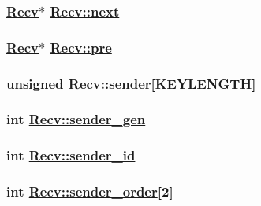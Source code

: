 \hypertarget{classRecv_o11}{
\subsubsection[next]{\setlength{\rightskip}{0pt plus 5cm}\hyperlink{classRecv}{Recv}$\ast$ \hyperlink{classRecv_o11}{Recv::next}}}
\label{classRecv_o11}


\hypertarget{classRecv_o10}{
\subsubsection[pre]{\setlength{\rightskip}{0pt plus 5cm}\hyperlink{classRecv}{Recv}$\ast$ \hyperlink{classRecv_o10}{Recv::pre}}}
\label{classRecv_o10}


\hypertarget{classRecv_o1}{
\subsubsection[sender]{\setlength{\rightskip}{0pt plus 5cm}unsigned \hyperlink{classRecv_o1}{Recv::sender}\mbox{[}\hyperlink{constant_8h_a10}{KEYLENGTH}\mbox{]}}}
\label{classRecv_o1}


\hypertarget{classRecv_o6}{
\subsubsection[sender\_\-gen]{\setlength{\rightskip}{0pt plus 5cm}int \hyperlink{classRecv_o6}{Recv::sender\_\-gen}}}
\label{classRecv_o6}


\hypertarget{classRecv_o9}{
\subsubsection[sender\_\-id]{\setlength{\rightskip}{0pt plus 5cm}int \hyperlink{classRecv_o9}{Recv::sender\_\-id}}}
\label{classRecv_o9}


\hypertarget{classRecv_o5}{
\subsubsection[sender\_\-order]{\setlength{\rightskip}{0pt plus 5cm}int \hyperlink{classRecv_o5}{Recv::sender\_\-order}\mbox{[}2\mbox{]}}}
\label{classRecv_o5}


